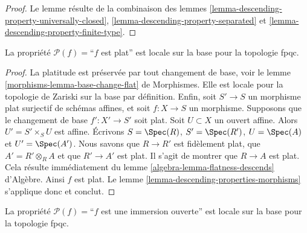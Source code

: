 \begin{proof}
Le lemme résulte de la combinaison des
lemmes \ref{lemma-descending-property-universally-closed},
\ref{lemma-descending-property-separated}
et \ref{lemma-descending-property-finite-type}.
\end{proof}

\begin{lemma}
\label{lemma-descending-property-flat}
La propriété $\mathcal{P}(f) =$``$f$ est plat''
est locale sur la base pour la topologie fpqc.
\end{lemma}

\begin{proof}
La platitude est préservée par tout changement de base, voir
le lemme \ref{morphisms-lemma-base-change-flat} de Morphismes.
Elle est locale pour la topologie de Zariski sur la base par définition.
Enfin, soit
$S' \to S$ un morphisme plat surjectif de schémas affines,
et soit $f : X \to S$ un morphisme. Supposons que le changement de base
$f' : X' \to S'$ soit plat.
Soit $U \subset X$ un ouvert affine. Alors $U' = S' \times_S U$
est affine. Écrivons
$S = \Spec(R)$,
$S' = \Spec(R')$,
$U = \Spec(A)$ et
$U' = \Spec(A')$.
Nous savons que $R \to R'$ est fidèlement plat,
que $A' = R' \otimes_R A$ et que $R' \to A'$ est plat.
Il s'agit de montrer que $R \to A$ est plat.
Cela résulte immédiatement du lemme
\ref{algebra-lemma-flatness-descends} d'Algèbre.
Ainsi $f$ est plat.
Le lemme \ref{lemma-descending-properties-morphisms} s'applique donc et conclut.
\end{proof}

\begin{lemma}
\label{lemma-descending-property-open-immersion}
La propriété $\mathcal{P}(f) =$``$f$ est une immersion ouverte''
est locale sur la base pour la topologie fpqc.
\end{lemma}

